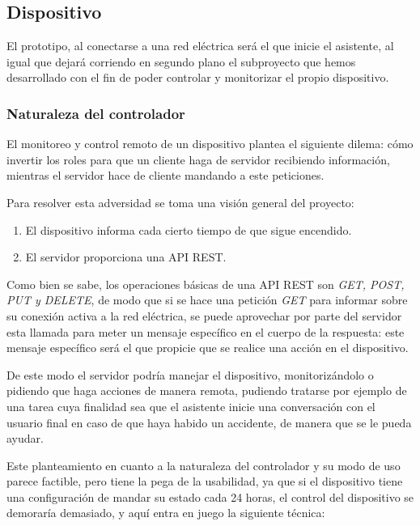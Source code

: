\subsection{Dispositivo}

El prototipo, al conectarse a una red eléctrica será el que inicie el asistente, al igual que dejará corriendo en segundo plano el subproyecto que hemos desarrollado con el fin de poder controlar y monitorizar el propio dispositivo.

    \subsubsection{Naturaleza del controlador}
    
        El monitoreo y control remoto de un dispositivo plantea el siguiente dilema: cómo invertir los roles para que un cliente haga de servidor recibiendo información, mientras el servidor hace de cliente mandando a este peticiones.
        
        Para resolver esta adversidad se toma una visión general del proyecto:
        \begin{enumerate}
            \item El dispositivo informa cada cierto tiempo de que sigue encendido.
            \item El servidor proporciona una API REST.
        \end{enumerate}
        
        Como bien se sabe, los operaciones básicas de una API REST son \textit{GET, POST, PUT y DELETE}, de modo que si se hace una petición \textit{GET} para informar sobre su conexión activa a la red eléctrica, se puede aprovechar por parte del servidor esta llamada para meter un mensaje específico en el cuerpo de la respuesta: este mensaje específico será el que propicie que se realice una acción en el dispositivo.
        
        De este modo el servidor podría manejar el dispositivo, monitorizándolo o pidiendo que haga acciones de manera remota, pudiendo tratarse por ejemplo de una tarea cuya finalidad sea que el asistente inicie una conversación con el usuario final en caso de que haya habido un accidente, de manera que se le pueda ayudar.
        
        Este planteamiento en cuanto a la naturaleza del controlador y su modo de uso parece factible, pero tiene la pega de la usabilidad, ya que si el dispositivo tiene una configuración de mandar su estado cada 24 horas, el control del dispositivo se demoraría demasiado, y aquí entra en juego la siguiente técnica:
        

